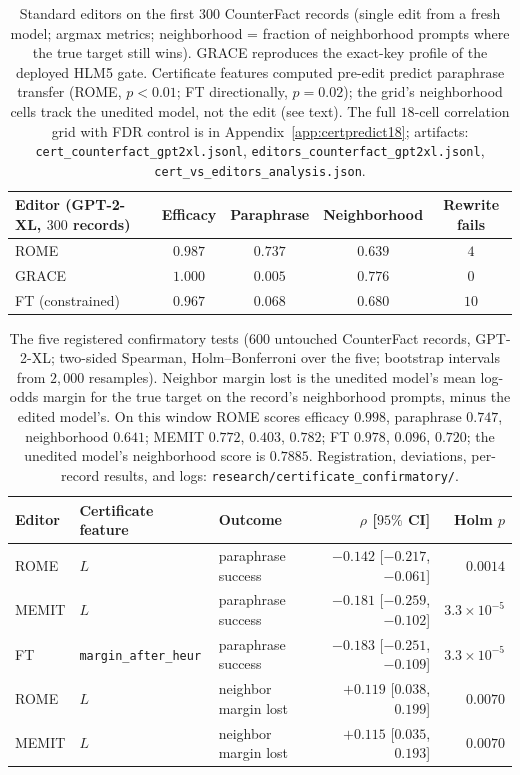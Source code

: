 \documentclass[10pt,twocolumn]{article}
\theoremstyle{remark}
\begin{document}
\begin{table}[t]
\centering\small
\begin{tabular}{l c c c c}
\toprule
Editor (GPT-2-XL, $300$ records) & Efficacy & Paraphrase & Neighborhood & Rewrite fails \\
\midrule
ROME & $0.987$ & $0.737$ & $0.639$ & $4$ \\
GRACE & $1.000$ & $0.005$ & $0.776$ & $0$ \\
FT (constrained) & $0.967$ & $0.068$ & $0.680$ & $10$ \\
\bottomrule
\end{tabular}
\caption{Standard editors on the first $300$ CounterFact records (single edit
from a fresh model; argmax metrics; neighborhood = fraction of neighborhood
prompts where the true target still wins). GRACE reproduces the exact-key
profile of the deployed HLM5 gate. Certificate features computed pre-edit
predict paraphrase transfer (ROME, $p<0.01$; FT directionally, $p=0.02$); the
grid's neighborhood cells track the unedited model, not the edit (see text).
The full $18$-cell correlation grid with FDR control is in
Appendix~\ref{app:certpredict18}; artifacts:
\texttt{cert\_counterfact\_gpt2xl.jsonl},
\texttt{editors\_counterfact\_gpt2xl.jsonl},
\texttt{cert\_vs\_editors\_analysis.json}.}
\label{tab:certpredict}
\end{table}

\begin{table}[t]
\centering\small
\begin{tabular}{l l l r r}
\toprule
Editor & Certificate feature & Outcome & $\rho$ [$95\%$ CI] & Holm $p$ \\
\midrule
ROME  & $L$ & paraphrase success & $-0.142$ [$-0.217$, $-0.061$] & $0.0014$ \\
MEMIT & $L$ & paraphrase success & $-0.181$ [$-0.259$, $-0.102$] & $3.3\times10^{-5}$ \\
FT    & \texttt{margin\_after\_heur} & paraphrase success & $-0.183$ [$-0.251$, $-0.109$] & $3.3\times10^{-5}$ \\
ROME  & $L$ & neighbor margin lost & $+0.119$ [$0.038$, $0.199$] & $0.0070$ \\
MEMIT & $L$ & neighbor margin lost & $+0.115$ [$0.035$, $0.193$] & $0.0070$ \\
\bottomrule
\end{tabular}
\caption{The five registered confirmatory tests ($600$ untouched CounterFact
records, GPT-2-XL; two-sided Spearman, Holm--Bonferroni over the five;
bootstrap intervals from $2{,}000$ resamples). Neighbor margin lost is the
unedited model's mean log-odds margin for the true target on the record's
neighborhood prompts, minus the edited model's. On this window ROME scores
efficacy $0.998$, paraphrase $0.747$, neighborhood $0.641$; MEMIT $0.772$,
$0.403$, $0.782$; FT $0.978$, $0.096$, $0.720$; the unedited model's
neighborhood score is $0.7885$. Registration, deviations, per-record results,
and logs: \texttt{research/certificate\_confirmatory/}.}
\label{tab:certconfirm}
\end{table}
\end{document}
